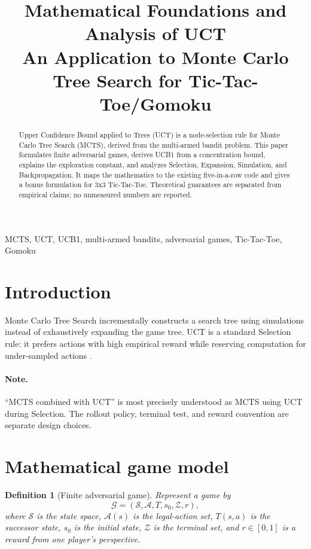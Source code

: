 \documentclass[conference]{IEEEtran}
\title{Mathematical Foundations and Analysis of UCT\\
\large An Application to Monte Carlo Tree Search for Tic-Tac-Toe/Gomoku}
\author{\IEEEauthorblockN{Student Author}
\IEEEauthorblockA{Department of Artificial Intelligence\\
University or Institution}}
\newtheorem{definition}{Definition}[section]
\begin{document}
\maketitle
\begin{abstract}
Upper Confidence Bound applied to Trees (UCT) is a node-selection rule for Monte
Carlo Tree Search (MCTS), derived from the multi-armed bandit problem. This paper
formulates finite adversarial games, derives UCB1 from a concentration bound,
explains the exploration constant, and analyzes Selection, Expansion, Simulation,
and Backpropagation. It maps the mathematics to the existing five-in-a-row code
and gives a bonus formulation for 3x3 Tic-Tac-Toe. Theoretical guarantees are
separated from empirical claims; no unmeasured numbers are reported.
\end{abstract}
\begin{IEEEkeywords}
MCTS, UCT, UCB1, multi-armed bandits, adversarial games, Tic-Tac-Toe, Gomoku
\end{IEEEkeywords}

\section{Introduction}
Monte Carlo Tree Search incrementally constructs a search tree using simulations
instead of exhaustively expanding the game tree. UCT is a standard Selection rule:
it prefers actions with high empirical reward while reserving computation for
under-sampled actions \cite{kocsis2006}.

\paragraph{Note.} ``MCTS combined with UCT'' is most precisely understood as MCTS
using UCT during Selection. The rollout policy, terminal test, and reward convention
are separate design choices.

\section{Mathematical game model}
\begin{definition}[Finite adversarial game]
Represent a game by
\[
\mathcal G=(\mathcal S,\mathcal A,T,s_0,\mathcal Z,r),
\]
where $\mathcal S$ is the state space, $\mathcal A(s)$ is the legal-action set,
$T(s,a)$ is the successor state, $s_0$ is the initial state, $\mathcal Z$ is the
terminal set, and $r\in[0,1]$ is a reward from one player's perspective.
\end{definition}
\end{document}
